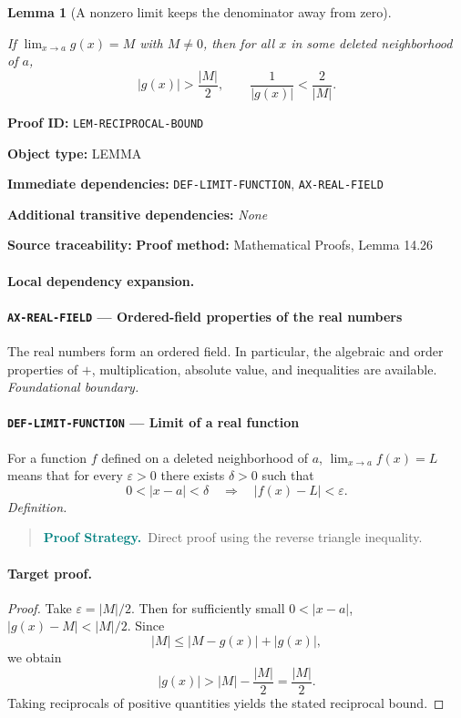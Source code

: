 \documentclass[10pt]{article}
\newcommand{\pidraw}[1]{\begingroup\urlstyle{tt}\nolinkurl{#1}\endgroup}
\newtheorem{lemma}[theorem]{Lemma}
\theoremstyle{definition}
\theoremstyle{remark}
\newenvironment{proofstrategy}
{\begin{quote}\small\noindent\textbf{\textcolor{teal}{Proof Strategy.}}\ }
{\end{quote}}
\newcommand{\meta}[2]{\noindent\textbf{#1:} #2\par}
\begin{document}
\begin{lemma}[A nonzero limit keeps the denominator away from zero]\label{prf:LEM-RECIPROCAL-BOUND}

If $\lim_{x\to a}g(x)=M$ with $M\ne0$, then for all $x$ in some deleted neighborhood of $a$,
\[
|g(x)|>\frac{|M|}{2},\qquad \frac1{|g(x)|}<\frac2{|M|}.
\]

\end{lemma}

\meta{Proof ID}{\pidraw{LEM-RECIPROCAL-BOUND}}
\meta{Object type}{LEMMA}
\meta{Immediate dependencies}{\pidraw{DEF-LIMIT-FUNCTION}, \pidraw{AX-REAL-FIELD}}
\meta{Additional transitive dependencies}{\emph{None}}
\meta{Source traceability}{\textbf{Proof method:} Mathematical Proofs, Lemma 14.26}

\paragraph{Local dependency expansion.}

\paragraph{\pidraw{AX-REAL-FIELD} --- Ordered-field properties of the real numbers}
The real numbers form an ordered field. In particular, the algebraic and order properties of $+$, multiplication, absolute value, and inequalities are available.
\textit{Foundational boundary.}

\paragraph{\pidraw{DEF-LIMIT-FUNCTION} --- Limit of a real function}
For a function $f$ defined on a deleted neighborhood of $a$, $\lim_{x\to a}f(x)=L$ means that for every $\varepsilon>0$ there exists $\delta>0$ such that
\[
0<|x-a|<\delta\quad\Longrightarrow\quad |f(x)-L|<\varepsilon.
\]
\textit{Definition.}

\begin{proofstrategy}Direct proof using the reverse triangle inequality.\end{proofstrategy}

\paragraph{Target proof.}

\begin{proof}

Take $\varepsilon=|M|/2$. Then for sufficiently small $0<|x-a|$,
$|g(x)-M|<|M|/2$. Since
\[
|M|\le |M-g(x)|+|g(x)|,
\]
we obtain
\[
|g(x)|>|M|-\frac{|M|}{2}=\frac{|M|}{2}.
\]
Taking reciprocals of positive quantities yields the stated reciprocal bound.

\end{proof}
\end{document}

